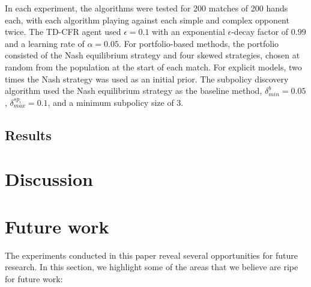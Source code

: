 \documentclass{aamas2013}
\begin{document}
    In each experiment, the algorithms were tested for 200 matches of 200 hands each, with each algorithm playing against each simple and complex opponent twice. The TD-CFR agent used $\epsilon=0.1$ with an exponential $\epsilon$-decay factor of $0.99$ and a learning rate of $\alpha=0.05$. For portfolio-based methods, the portfolio consisted of the Nash equilibrium strategy and four skewed strategies, chosen at random from the population at the start of each match. For explicit models, two times the Nash strategy was used as an initial prior. The subpolicy discovery algorithm used the Nash equilibrium strategy as the baseline method, $\delta_{min}^{b}=0.05$, $\delta_{max}^{sp_i}=0.1$, and a minimum subpolicy size of 3.
    
    \subsection{Results}



\section{Discussion}

\section{Future work}
The experiments conducted in this paper reveal several opportunities for future research. In this section, we highlight some of the areas that we believe are ripe for future work:
\end{document}
